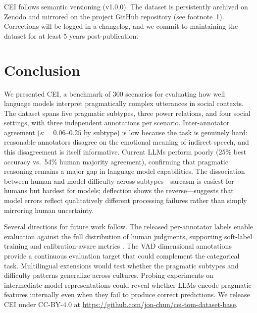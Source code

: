 \documentclass[twoside,11pt]{article}
\begin{document}
CEI follows semantic versioning (v1.0.0). The dataset is persistently archived on Zenodo \citep{chun2026cei} and mirrored on the project GitHub repository (see footnote~1). Corrections will be logged in a changelog, and we commit to maintaining the dataset for at least 5 years post-publication.

\section{Conclusion}
\label{sec:conclusion}

We presented CEI, a benchmark of 300 scenarios for evaluating how well language models interpret pragmatically complex utterances in social contexts. The dataset spans five pragmatic subtypes, three power relations, and four social settings, with three independent annotations per scenario. Inter-annotator agreement ($\kappa = 0.06$--$0.25$ by subtype) is low because the task is genuinely hard: reasonable annotators disagree on the emotional meaning of indirect speech, and this disagreement is itself informative. Current LLMs perform poorly (25\% best accuracy vs.\ 54\% human majority agreement), confirming that pragmatic reasoning remains a major gap in language model capabilities. The dissociation between human and model difficulty across subtypes---sarcasm is easiest for humans but hardest for models; deflection shows the reverse---suggests that model errors reflect qualitatively different processing failures rather than simply mirroring human uncertainty.

Several directions for future work follow. The released per-annotator labels enable evaluation against the full distribution of human judgments, supporting soft-label training and calibration-aware metrics \citep{uma2021learning}. The VAD dimensional annotations provide a continuous evaluation target that could complement the categorical task. Multilingual extensions would test whether the pragmatic subtypes and difficulty patterns generalize across cultures. Probing experiments on intermediate model representations could reveal whether LLMs encode pragmatic features internally even when they fail to produce correct predictions. We release CEI under CC-BY-4.0 at \url{https://github.com/jon-chun/cei-tom-dataset-base}.
\end{document}
